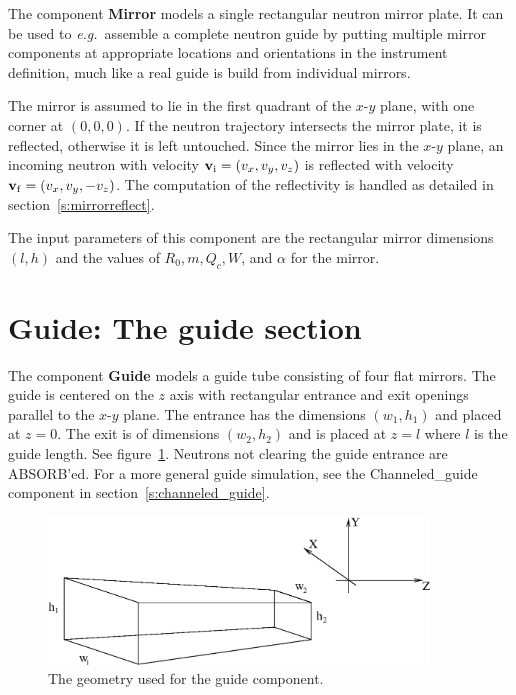 The component {\bf Mirror} 
models a single rectangular neutron mirror plate. It can
be used to \textit{e.g.}~assemble a complete neutron guide by putting multiple
mirror components at appropriate locations and orientations in the
instrument definition, much like a real guide is build from individual
mirrors.

The mirror is assumed to lie in the first quadrant of the
$x$-$y$ plane, with one corner at $(0,0,0)$. 
If the neutron trajectory intersects the mirror plate, it is
reflected, otherwise it is left untouched. Since the mirror lies in the
$x$-$y$ plane, an incoming neutron with velocity 
${\bf v}_{\rm i} = (v_x,v_y,v_z)$
is reflected with velocity ${\bf v}_{\rm f} = (v_x,v_y,-v_z)$. 
The computation of the reflectivity is handled as detailed in
section~\ref{s:mirrorreflect}.

The input parameters of this component are
the rectangular mirror dimensions $(l, h)$
and the values of $R_0, m, Q_c, W$, and $\alpha$ for the mirror.


\section{Guide: The guide section}

The component {\bf Guide} 
models a guide tube consisting of four flat mirrors. The
guide is centered on the $z$ axis with rectangular entrance and exit
openings parallel to the $x$-$y$ plane. The entrance has the dimensions
$(w_1,h_1)$ and placed at $z=0$. The exit is of dimensions $(w_2,h_2)$
and is placed at $z=l$ where $l$ is the guide length. See
figure~\ref{f:guide}. Neutrons not clearing the guide entrance are
ABSORB'ed. For a more general guide simulation, see the Channeled\_guide
component in section~\ref{s:channeled_guide}.

\begin{figure}
  \begin{center}
    \includegraphics[width=0.9\textwidth]{figures/guide1.eps}
  \end{center}
\caption{The geometry used for the guide component.}
\label{f:guide}
\end{figure}

